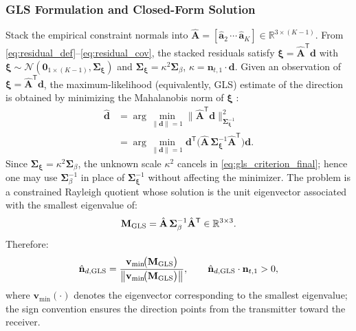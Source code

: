 \documentclass[journal]{IEEEtran}
\begin{document}
\subsubsection{GLS Formulation and Closed-Form Solution}
Stack the empirical constraint normals into
\(\hat{\mathbf A}=[\hat{\mathbf a}_2\,\cdots\,\hat{\mathbf a}_K]\in\mathbb R^{3\times(K-1)}.\)
From \eqref{eq:residual_def}–\eqref{eq:residual_cov}, the stacked residuals satisfy
\(\boldsymbol{\xi}=\hat{\mathbf A}^{\mathsf T}\mathbf d\)
with
\(\boldsymbol{\xi}\sim\mathcal N(\mathbf{0}_{1\times (K-1)},\mathbf\Sigma_{\boldsymbol{\xi}})\)
and
\(\mathbf\Sigma_{\boldsymbol{\xi}}=\kappa^{2}\mathbf\Sigma_{\beta}\),
\(\kappa=\mathbf n_{t,1}\!\cdot\!\mathbf d\).
Given an observation of \(\boldsymbol{\xi}=\hat{\mathbf A}^{\mathsf T}\mathbf d\), the maximum-likelihood (equivalently, GLS) estimate of the direction is obtained by minimizing the Mahalanobis norm of \(\boldsymbol{\xi}\) \cite{Bishop2006}:
\begin{equation}
\begin{aligned}
  \hat{\mathbf d}
  &= \arg\min_{\|\mathbf d\|=1}
     \bigl\|\hat{\mathbf A}^{\mathsf T}\mathbf d\bigr\|^{2}_{\mathbf\Sigma_{\boldsymbol{\xi}}^{-1}} \\
  &= \arg\min_{\|\mathbf d\|=1}
     \mathbf d^{\mathsf T}\!\bigl(\hat{\mathbf A}\,\mathbf\Sigma_{\boldsymbol{\xi}}^{-1}\hat{\mathbf A}^{\mathsf T}\bigr)\mathbf{d}.     
\end{aligned}
\label{eq:gls_criterion_final}
\end{equation}
Since \(\mathbf\Sigma_{\boldsymbol{\xi}}=\kappa^{2}\mathbf\Sigma_{\beta}\), the unknown scale \(\kappa^{2}\) cancels in \eqref{eq:gls_criterion_final}; 
hence one may use \(\mathbf\Sigma_{\beta}^{-1}\) in place of \(\mathbf\Sigma_{\boldsymbol{\xi}}^{-1}\) without affecting the minimizer. The problem is a constrained Rayleigh quotient whose solution is the unit eigenvector associated with the smallest eigenvalue of:
\begin{equation}
  \mathbf M_{\rm GLS}=\hat{\mathbf A}\,\mathbf\Sigma_{\beta}^{-1}\hat{\mathbf A}^{\mathsf T}\in\mathbb R^{3\times3}.
  \label{eq:M_GLS_final}
\end{equation}
Therefore:
\begin{equation}
  \hat{\mathbf n}_{d,{\rm GLS}}
  = \frac{\mathbf v_{\min}\!\bigl(\mathbf M_{\rm GLS}\bigr)}
         {\bigl\|\mathbf v_{\min}\!\bigl(\mathbf M_{\rm GLS}\bigr)\bigr\|},
  \qquad
  \hat{\mathbf n}_{d,{\rm GLS}}\cdot\mathbf n_{t,1} > 0,
  \label{eq:gls_dir_final}
\end{equation}
where \(\mathbf v_{\min}(\cdot)\) denotes the eigenvector corresponding to the smallest eigenvalue; the sign convention ensures the direction points from the transmitter toward the receiver.
\end{document}
